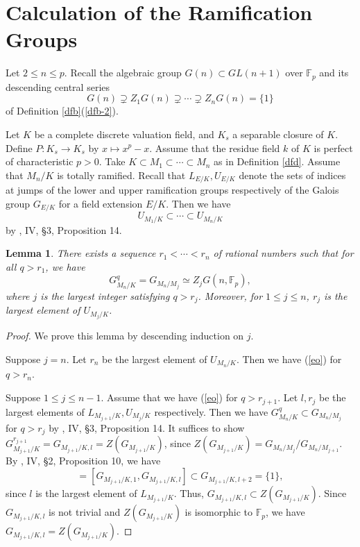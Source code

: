\documentclass[10pt,a4paper]{amsart}
\numberwithin{equation}{section}
\theoremstyle{plain}
\newtheorem{lemm}[theo]{Lemma}
\theoremstyle{definition}
\begin{document}
      

        



\section{Calculation of the Ramification Groups}\label{sc}
Let $2\leq n\leq p$. Recall the algebraic group $G(n)\subset GL(n+1)$ over $\mathbb{F}_p$ and its descending central series 
\begin{equation}
G(n)\supsetneq Z_1G(n)\supsetneq\cdots\supsetneq Z_nG(n)=\{1\}
\end{equation}
of Definition \ref{dfb}(\ref{dfb-2}).  

Let $K$ be a complete discrete valuation field, and $K_s$ a separable closure of $K$. Define $P:K_s\to K_s$ by $x\mapsto x^p-x$.  Assume that the residue field $k$ of $K$ is perfect of characteristic $p>0$. Take $K\subset M_1\subset\cdots\subset M_n$ as in Definition \ref{dfd}. Assume that $M_n/K$ is totally ramified. Recall that $L_{E/K},U_{E/K}$ denote the sets of indices at jumps of the lower and upper ramification groups respectively of the Galois group $G_{E/K}$ for a field extension $E/K$. Then we have
\begin{equation}
U_{M_1/K}\subset\cdots\subset U_{M_n/K}
\end{equation}
by \cite{Se}, IV, \S 3, Proposition 14.       


\begin{lemm}\label{lad}
  There exists a sequence $r_1<\cdots<r_n$ of rational numbers such that for all $q>r_1$, we have
  \begin{equation}\label{eo}
  G_{M_n/K}^{q}=G_{M_n/M_j}\simeq  Z_jG(n,\mathbb{F}_p),
  \end{equation}
  where $j$ is the largest integer satisfying $q>r_j$. Moreover, for $1\leq j\leq n$, $r_j$ is the largest element of $U_{M_j/K}$.
\end{lemm}

\begin{proof}
  We prove this lemma by descending induction on $j$.

  Suppose $j=n$. Let $r_n$ be the largest element of $U_{M_{n}/K}$. Then we have (\ref{eo}) for $q>r_n$.
  
  Suppose $1\leq j\leq n-1$. Assume that we have (\ref{eo}) for $q>r_{j+1}$. Let $l,r_j$ be the largest elements of $L_{M_{j+1}/K},U_{M_{j}/K}$ respectively. Then we have $G_{M_n/K}^{q}\subset G_{M_n/M_j}$ for $q>r_j$ by \cite{Se}, IV, \S 3, Proposition 14. It suffices to show $G_{M_{j+1}/K}^{r_{j+1}}=G_{M_{j+1}/K,l}=Z(G_{M_{j+1}/K})$, since $Z(G_{M_{j+1}/K})=G_{M_n/M_{j}}/G_{M_n/M_{j+1}}$. By \cite{Se}, IV, \S 2, Proposition 10, we have
  \begin{equation}
    [G_{M_{j+1}/K},G_{M_{j+1}/K,l}]=[G_{M_{j+1}/K,1},G_{M_{j+1}/K,l}]\subset G_{M_{j+1}/K,l+2}=\{1\},
  \end{equation}
  since $l$ is the largest element of $L_{M_{j+1}/K}$. Thus, $G_{M_{j+1}/K,l}\subset Z(G_{M_{j+1}/K})$. Since $G_{M_{j+1}/K,l}$ is not trivial and $Z(G_{M_{j+1}/K})$ is isomorphic to $\mathbb{F}_p$, we have $G_{M_{j+1}/K,l}=Z(G_{M_{j+1}/K})$.
\end{proof}
\end{document}
